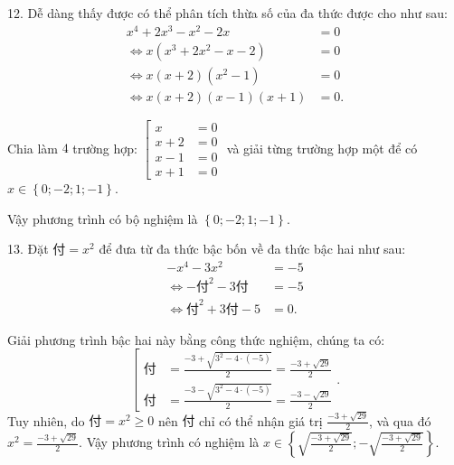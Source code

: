 12. Dễ dàng thấy được có thể phân tích thừa số của đa thức được cho như sau:
\begin{align*}
   x^4 + 2x^3 - x^2 -2x &= 0 \\
   \iff x(x^3 + 2x^2 - x - 2) &= 0 \\
   \iff x(x + 2)(x^2 - 1) &= 0 \\
   \iff x(x + 2)(x - 1)(x + 1) &= 0.
\end{align*}

Chia làm $4$ trường hợp: $\left[
   \begin{aligned}
      x &= 0 \\
      x + 2&= 0 \\
      x - 1 &= 0 \\
      x + 1 &= 0
   \end{aligned}
\right.$ và giải từng trường hợp một để có $x \in \left\{0; -2; 1; -1\right\}$.

Vậy phương trình có bộ nghiệm là $\displaystyle\left\{0; -2; 1; -1\right\}$.

\def\varPhu {\textit{付}}

13. Đặt $\varPhu = x^2$ để đưa từ đa thức bậc bốn về đa thức bậc hai như sau:
\begin{align*}
   -x^4 - 3x^2 &= -5 \\
   \iff -\varPhu^2 - 3\varPhu &= -5 \\
   \iff \varPhu^2 + 3\varPhu - 5 &= 0.
\end{align*}

Giải phương trình bậc hai này bằng công thức nghiệm, chúng ta có:
$$
\left[
   \begin{aligned}
      \varPhu &= \frac{-3 + \sqrt{3^2 - 4 \cdot (-5)}}{2} = \frac{-3 + \sqrt{29}}{2} \\
      \varPhu &= \frac{-3 - \sqrt{3^2 - 4 \cdot (-5)}}{2} = \frac{-3 - \sqrt{29}}{2}
   \end{aligned}
\right..
$$ Tuy nhiên, do $\varPhu = x^2 \geq 0$ nên $\varPhu$ chỉ có thể nhận giá trị $\frac{-3 + \sqrt{29}}{2}$, và qua đó $x^2 = \frac{-3 + \sqrt{29}}{2}$. Vậy phương trình có nghiệm là $x \in \left\{\sqrt{\frac{-3 + \sqrt{29}}{2}}; -\sqrt{\frac{-3 + \sqrt{29}}{2}}\right\}$.

